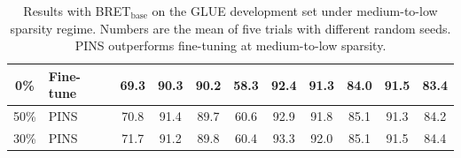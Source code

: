 \begin{table}[t]
\begin{tabular}{c|l|cccccccc|c}
		\midrule
		\multicolumn{1}{c|}{0\%}   & Fine-tune                                   & 69.3                                                                                   &
		90.3                                                                        &90.2           & 58.3                                                                                    & 92.4                                                                                     & 91.3                                                                                    & 84.0                                                                                    & 91.5                                 &  83.4                                                \\
		\midrule
		\multirow{1}{*}{50\%}   &PINS                                             & 70.8                                                                                     &  91.4                                                                                  &89.7   &    60.6                                                                          &    92.9                                                                                 &   91.8                                                                              &  85.1                                                                                    &      91.3                                                             & 84.2              \\
		\multirow{1}{*}{30\%} 
		&PINS                                            &    71.7                                                                                   & 91.2                                                                             &89.8    &60.4                                                                                   &  93.3                                                                                      &  92.0                                                                                    &      85.1                                                                               &  91.5                                &  84.4       \\
		\bottomrule                                     
	\end{tabular}
	\caption{Results with BRET$_{\text{base}}$ on the GLUE development set under medium-to-low sparsity regime. Numbers are the mean of five trials with different random seeds. PINS outperforms fine-tuning at medium-to-low sparsity.}
	\label{table:mtl}
\end{table}

